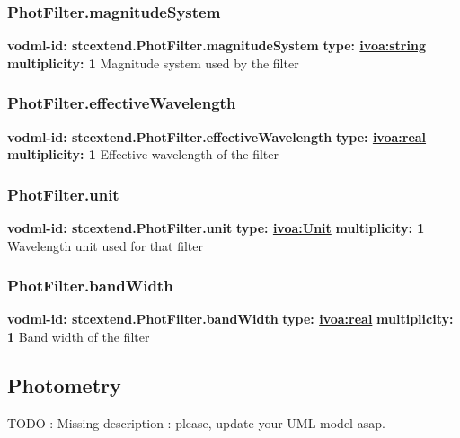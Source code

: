     \subsubsection{PhotFilter.magnitudeSystem}
      \textbf{vodml-id: stcextend.PhotFilter.magnitudeSystem} \newline
      \textbf{type: \hyperref[sect:ivoa]{ivoa:string}} \newline
      \textbf{multiplicity: 1} \newline 
      Magnitude system used by the filter

    \subsubsection{PhotFilter.effectiveWavelength}
      \textbf{vodml-id: stcextend.PhotFilter.effectiveWavelength} \newline
      \textbf{type: \hyperref[sect:ivoa]{ivoa:real}} \newline
      \textbf{multiplicity: 1} \newline 
      Effective wavelength of the filter

    \subsubsection{PhotFilter.unit}
      \textbf{vodml-id: stcextend.PhotFilter.unit} \newline
      \textbf{type: \hyperref[sect:ivoa]{ivoa:Unit}} \newline
      \textbf{multiplicity: 1} \newline 
      Wavelength unit used for that filter

    \subsubsection{PhotFilter.bandWidth}
      \textbf{vodml-id: stcextend.PhotFilter.bandWidth} \newline
      \textbf{type: \hyperref[sect:ivoa]{ivoa:real}} \newline
      \textbf{multiplicity: 1} \newline 
      Band width of the filter

  \subsection{Photometry}
  \label{sect:stcextend.Photometry}
    TODO : Missing description : please, update your UML model asap.

